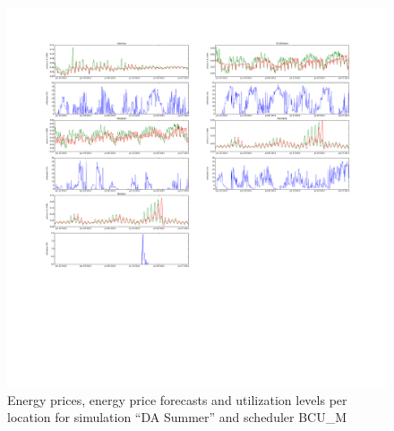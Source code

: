\begin{figure}[htbp]
	\centering
	\vspace*{-0.6in}
	\hspace*{-1.4in}
		\includegraphics[width=1.60\textwidth]{figures/appendix_simulation_results/DA_Summer_scenario_5.pdf}
	\vspace*{-2.8in}
	\caption{Energy prices, energy price forecasts and utilization levels per location for simulation ``DA Summer'' and scheduler BCU\_M}
	\label{fig:app_DA_Summer_scenario_5}
\end{figure}

